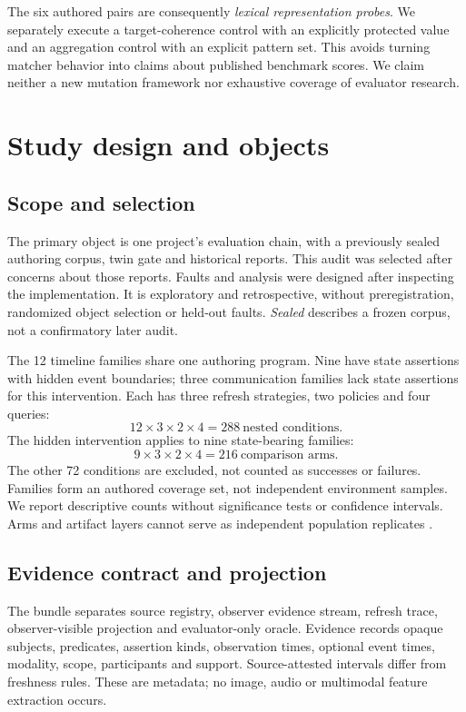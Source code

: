 \documentclass[11pt]{article}
\begin{document}
The six authored pairs are consequently \emph{lexical representation probes}. We separately execute a target-coherence control with an explicitly protected value and an aggregation control with an explicit pattern set. This avoids turning matcher behavior into claims about published benchmark scores. We claim neither a new mutation framework nor exhaustive coverage of evaluator research.

\section{Study design and objects}
\subsection{Scope and selection}
The primary object is one project's evaluation chain, with a previously sealed authoring corpus, twin gate and historical reports. This audit was selected after concerns about those reports. Faults and analysis were designed after inspecting the implementation. It is exploratory and retrospective, without preregistration, randomized object selection or held-out faults. \emph{Sealed} describes a frozen corpus, not a confirmatory later audit.

The 12 timeline families share one authoring program. Nine have state assertions with hidden event boundaries; three communication families lack state assertions for this intervention. Each has three refresh strategies, two policies and four queries:
\[
12\times3\times2\times4=288\ \text{nested conditions}.
\]
The hidden intervention applies to nine state-bearing families:
\[
9\times3\times2\times4=216\ \text{comparison arms}.
\]
The other 72 conditions are excluded, not counted as successes or failures. Families form an authored coverage set, not independent environment samples. We report descriptive counts without significance tests or confidence intervals. Arms and artifact layers cannot serve as independent population replicates \cite{hurlbert}.

\subsection{Evidence contract and projection}
The bundle separates source registry, observer evidence stream, refresh trace, observer-visible projection and evaluator-only oracle. Evidence records opaque subjects, predicates, assertion kinds, observation times, optional event times, modality, scope, participants and support. Source-attested intervals differ from freshness rules. These are metadata; no image, audio or multimodal feature extraction occurs.
\end{document}
